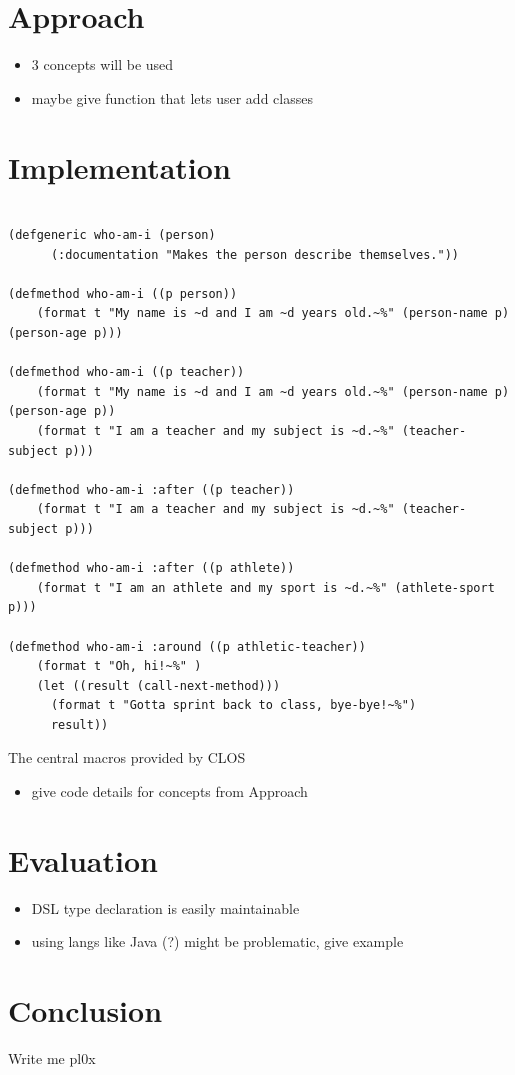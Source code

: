 \documentclass[oribibl]{llncs}
\begin{document}
\section{Approach}
\label{sec:approach}


\begin{itemize}
\item 3 concepts will be used
\item maybe give function that lets user add classes
\end{itemize}


\section{Implementation}
\label{sec:implementation}

\begin{listing}[]%
\begin{verbatim}

(defgeneric who-am-i (person)
      (:documentation "Makes the person describe themselves."))

(defmethod who-am-i ((p person))
    (format t "My name is ~d and I am ~d years old.~%" (person-name p) (person-age p)))

(defmethod who-am-i ((p teacher))
    (format t "My name is ~d and I am ~d years old.~%" (person-name p) (person-age p))
    (format t "I am a teacher and my subject is ~d.~%" (teacher-subject p)))

(defmethod who-am-i :after ((p teacher))
    (format t "I am a teacher and my subject is ~d.~%" (teacher-subject p)))

(defmethod who-am-i :after ((p athlete))
    (format t "I am an athlete and my sport is ~d.~%" (athlete-sport p)))

(defmethod who-am-i :around ((p athletic-teacher))
    (format t "Oh, hi!~%" )
    (let ((result (call-next-method)))
      (format t "Gotta sprint back to class, bye-bye!~%")
      result))

\end{verbatim}
\caption{The central macros provided by CLOS}
\label{lst:clossyntax}
\end{listing}



\begin{itemize}
\item give code details for concepts from Approach
\end{itemize}

\section{Evaluation}
\label{sec:evaluation}

\begin{itemize}
\item DSL type declaration is easily maintainable
\item using langs like Java (?) might be problematic, give example
\end{itemize}


\section{Conclusion}
\label{sec:conclusion}
Write me pl0x

\newpage
\nocite{*}


\end{document}
